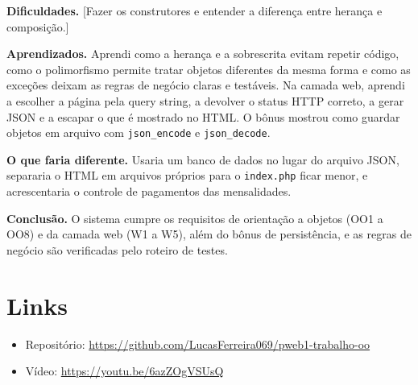 \documentclass[12pt,a4paper]{article}
\newcommand{\pendente}[1]{{\color{red}[#1]}}
\begin{document}
\textbf{Dificuldades.} \pendente{Fazer os construtores e entender a diferença entre herança e composição.}

\textbf{Aprendizados.} Aprendi como a herança e a sobrescrita evitam repetir código, como o polimorfismo permite tratar objetos diferentes da mesma forma e como as exceções deixam as regras de negócio claras e testáveis. Na camada web, aprendi a escolher a página pela query string, a devolver o status HTTP correto, a gerar JSON e a escapar o que é mostrado no HTML. O bônus mostrou como guardar objetos em arquivo com \texttt{json\_encode} e \texttt{json\_decode}.

\textbf{O que faria diferente.} Usaria um banco de dados no lugar do arquivo JSON, separaria o HTML em arquivos próprios para o \texttt{index.php} ficar menor, e acrescentaria o controle de pagamentos das mensalidades.

\textbf{Conclusão.} O sistema cumpre os requisitos de orientação a objetos (OO1 a OO8) e da camada web (W1 a W5), além do bônus de persistência, e as regras de negócio são verificadas pelo roteiro de testes.

\section*{Links}
\begin{itemize}
  \item Repositório: \url{https://github.com/LucasFerreira069/pweb1-trabalho-oo}
  \item Vídeo: \url{https://youtu.be/6azZOgVSUsQ}
\end{itemize}
\end{document}
